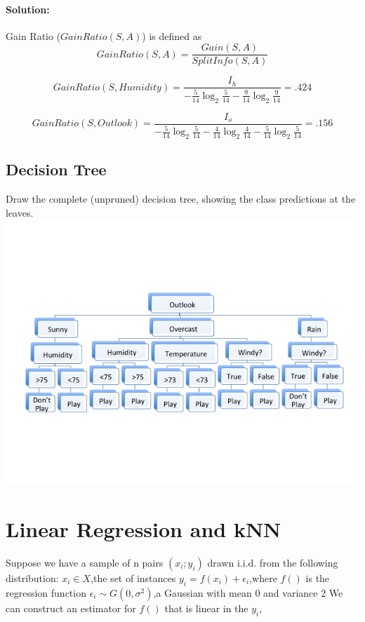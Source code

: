 \documentclass{article}
\begin{document}
\paragraph{Solution:}
Gain Ratio ($GainRatio(S,A)$) is defined as
$$ GainRatio(S,A) = \frac{Gain(S,A)}{SplitInfo(S,A)}
$$ 

$$ GainRatio(S,Humidity) = \frac{I_h}{-\frac{5}{14}\log_2\frac{5}{14} - \frac{9}{14}\log_2\frac{9}{14}} = .424
$$

$$ GainRatio(S,Outlook) = \frac{I_o}{-\frac{5}{14}\log_2\frac{5}{14} - \frac{4}{14}\log_2\frac{4}{14} - \frac{5}{14}\log_2\frac{5}{14}} = .156
$$

\subsection {Decision Tree} 
Draw the complete (unpruned) decision tree, showing the class predictions at the leaves. 
\includegraphics[width = \linewidth]{dTree_un.png}


\section{Linear Regression and kNN}

Suppose we have a sample of n pairs $(x_i; y_i)$ drawn i.i.d. from the following
distribution:
\newline
$x_i\in X$,the set of instances
\newline 
$y_i = f(x_i) + \epsilon_i$,where $f()$ is the regression function
\newline 
$\epsilon_i \sim G(0,\sigma^2)$,a Gaussian with mean 0 and variance 2
\newline 
We can construct an estimator for $f()$ that is linear in the $y_i$,
\end{document}
